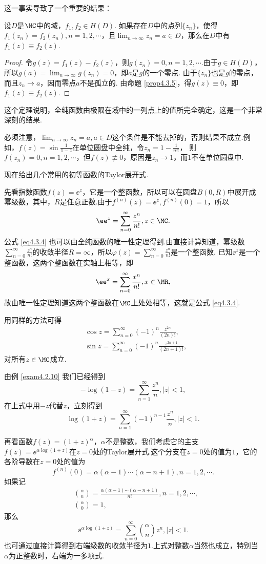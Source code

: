 这一事实导致了一个重要的结果：
\begin{theorem}\label{thm4.3.7}
设$D$是$\MC$中的域，$f_1,f_2\in H(D)$. 如果存在$D$中的点列$\{z_n\}$，使得$f_1(z_n)=f_2(z_n),n=1,2,\cdots$，且$\lim_{n\to\infty}z_n=a\in D$，那么在$D$中有$f_1(z)\equiv f_2(z)$.
\end{theorem}
\begin{proof}
令$g(z)=f_1(z)-f_2(z)$，则$g(z_n)=0,n=1,2,\cdots$.由于$g\in H(D)$，所以$g(a)=\lim_{n\to\infty}g(z_n)=0$，即$a$是$g$的一个零点. 由于$\{z_n\}$也是$g$的零点，而且$z_n\to a$，因而零点$a$不是孤立的. 由命题 \ref{prop4.3.5}，得$g(z)\equiv 0$，即$f_1(z)\equiv f_2(z)$.
\end{proof}

这个定理说明，全纯函数由极限在域中的一列点上的值所完全确定，这是一个非常深刻的结果.

必须注意，$\lim_{n\to\infty}z_n=a,a\in D$这个条件是不能去掉的，否则结果不成立.例如，$f(z)=\sin\frac1{1-z}$在单位圆盘中全纯，令$z_n=1-\frac1{n\pi}$，
则$f(z_n)=0,n=1,2,\cdots$，但$f(z)\not\equiv0$，原因是$z_n\to1$，而$1$不在单位圆盘中.

现在给出几个常用的初等函数的Taylor展开式.

先看指数函数$f(z)=\ee^z$，它是一个整函数，所以可以在圆盘$B(0,R)$中展开成幂级数，其中，$R$是任意正数.由于$f^{(n)}(z)=\ee^z,f^{(n)}(0)=1$，所以
\begin{equation}\label{eq4.3.4}
\ee^z=\sum_{n=0}^\infty\frac{z^n}{n!},z\in \MC.
\end{equation}
公式 \eqref{eq4.3.4} 也可以由全纯函数的唯一性定理得到.由直接计算知道，幂级数$\sum_{n=0}^\infty\frac{z^n}{n!}$的收敛半径$R=\infty$，所以$\varphi(z)=\sum_ {n=0}^\infty\frac{z^n}{n!}$是一个整函数. 已知$\ee^z$是一个整函数，这两个整函数在实轴上相等，即
\[\ee^x=\sum_{n=0}^\infty \frac{x^n}{n!},x\in \MR,\]
故由唯一性定理知道这两个整函数在$\MC$上处处相等，这就是公式 \eqref{eq4.3.4}.

用同样的方法可得
\begin{align*}
&\cos z=\sum_{n=0}^\infty(-1)^n\frac{z^{2n}}{(2n)!},\\
&\sin z=\sum_{n=0}^\infty(-1)^n\frac{z^{2n+1}}{(2n+1)!},
\end{align*}
对所有$z\in \MC$成立.

由例 \ref{exam4.2.10} 我们已经得到
\[-\log(1-z)=\sum_{n=1}^\infty \frac{z^n}n,|z|<1,\]
在上式中用$-z$代替$z$，立刻得到
\[\log(1+z)=\sum_{n=1}^\infty(-1)^{n-1}\frac{z^n}n,|z|<1.\]

再看函数$f(z)=(1+z)^\alpha$，$\alpha$不是整数，我们考虑它的主支$f(z)=\ee^{\alpha\log(1+z)}$在$z=0$处的Taylor展开式.这个分支在$z=0$处的值为$1$，它的各阶导数在$z=0$处的值为
\[f^{(n)}(0)=\alpha(\alpha-1)\cdots(\alpha-n+1),n=1,2,\cdots.\]
如果记
\begin{align*}
  &\binom\alpha n=\frac{\alpha(\alpha-1)\cdots(\alpha-n+1)}{n!},n=1,2,\cdots,\\
  &\binom\alpha0=1,
\end{align*}
那么
\[\ee^{\alpha\log(1+z)}=\sum_{n=0}^\infty\binom\alpha nz^n,|z|<1.\]
也可通过直接计算得到右端级数的收敛半径为$1$.上式对整数$\alpha$当然也成立，特别当$\alpha$为正整数时，右端为一多项式.

